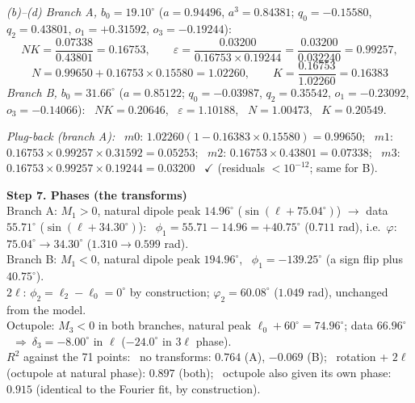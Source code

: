 \documentclass[11pt]{article}
\begin{document}
\emph{(b)--(d) Branch A, $b_0=19.10^\circ$} ($a=0.94496$, $a^3=0.84381$; $q_0=-0.15580$, $q_2=0.43801$, $o_1=+0.31592$, $o_3=-0.19244$):
\[
NK=\frac{0.07338}{0.43801}=0.16753,\qquad
\varepsilon=\frac{0.03200}{0.16753\times0.19244}=\frac{0.03200}{0.032240}=0.99257,
\]
\[
N=0.99650+0.16753\times0.15580=1.02260,\qquad K=\frac{0.16753}{1.02260}=0.16383
\]
\emph{Branch B, $b_0=31.66^\circ$} ($a=0.85122$; $q_0=-0.03987$, $q_2=0.35542$, $o_1=-0.23092$, $o_3=-0.14066$):
\ $NK=0.20646$, \ $\varepsilon=1.10188$, \ $N=1.00473$, \ $K=0.20549$.

\emph{Plug-back (branch A):} \
$m0$: $1.02260(1-0.16383\times0.15580)=0.99650$; \
$m1$: $0.16753\times0.99257\times0.31592=0.05253$; \
$m2$: $0.16753\times0.43801=0.07338$; \
$m3$: $0.16753\times0.99257\times0.19244=0.03200$ \ $\checkmark$ (residuals $<10^{-12}$; same for B).

\medskip\textbf{Step 7. Phases (the transforms)}\\[2pt]
Branch A: $M_1>0$, natural dipole peak $14.96^\circ$ ($\sin(\ell+75.04^\circ)$) $\to$ data $55.71^\circ$ ($\sin(\ell+34.30^\circ)$):
\ $\phi_1=55.71-14.96=+40.75^\circ$ ($0.711$ rad), i.e.\ $\varphi$: $75.04^\circ\to34.30^\circ$ ($1.310\to0.599$ rad).\\
Branch B: $M_1<0$, natural dipole peak $194.96^\circ$, \ $\phi_1=-139.25^\circ$ (a sign flip plus $40.75^\circ$).\\
$2\ell$: $\phi_2=\ell_2-\ell_0=0^\circ$ by construction; $\varphi_2=60.08^\circ$ ($1.049$ rad), unchanged from the model.\\
Octupole: $M_3<0$ in both branches, natural peak $\ell_0+60^\circ=74.96^\circ$; data $66.96^\circ$ \ $\Rightarrow\ \delta_3=-8.00^\circ$ in $\ell$ ($-24.0^\circ$ in $3\ell$ phase).\\[2pt]
$R^2$ against the 71 points: \ no transforms: $0.764$ (A), $-0.069$ (B); \ rotation + $2\ell$ (octupole at natural phase): $0.897$ (both);
\ octupole also given its own phase: $0.915$ (identical to the Fourier fit, by construction).
\end{document}
